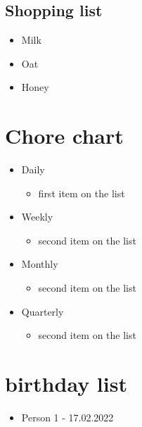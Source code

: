 \documentclass[a4paper]{article}
\begin{document}
\subsection{Shopping list}
		\begin{itemize}
     \item Milk
     \item Oat
     \item Honey
     \end{itemize}
\section{Chore chart}
\begin{itemize}
    \item Daily
    \begin{itemize}
        \item first item on the list
    \end{itemize}
    \item Weekly
    \begin{itemize}
        \item second item on the list
    \end{itemize}
    \item Monthly
    \begin{itemize}
        \item second item on the list
    \end{itemize}
    \item Quarterly
    \begin{itemize}
        \item second item on the list
    \end{itemize}
\end{itemize}
\section{birthday list}
\begin{itemize}
	\item Person 1 - 17.02.2022 
\end{itemize}
\newpage
\end{document}

